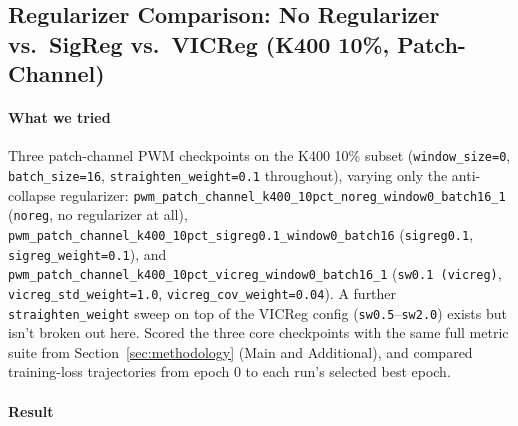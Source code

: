 \subsection{Regularizer Comparison: No Regularizer vs.\ SigReg vs.\ VICReg (K400 10\%, Patch-Channel)}
\label{exp:regularizer-comparison-k400}

\paragraph{What we tried} Three patch-channel PWM checkpoints on the K400 10\% subset
(\texttt{window\_size=0}, \texttt{batch\_size=16}, \texttt{straighten\_weight=0.1}
throughout), varying only the anti-collapse regularizer:
\texttt{pwm\_patch\_channel\_k400\_10pct\_noreg\_window0\_batch16\_1} (\texttt{noreg},
no regularizer at all), \texttt{pwm\_patch\_channel\_k400\_10pct\_sigreg0.1\_window0\_batch16}
(\texttt{sigreg0.1}, \texttt{sigreg\_weight=0.1}), and
\texttt{pwm\_patch\_channel\_k400\_10pct\_vicreg\_window0\_batch16\_1} (\texttt{sw0.1
(vicreg)}, \texttt{vicreg\_std\_weight=1.0}, \texttt{vicreg\_cov\_weight=0.04}). A further
\texttt{straighten\_weight} sweep on top of the VICReg config
(\texttt{sw0.5}--\texttt{sw2.0}) exists but isn't broken out here. Scored the three core
checkpoints with the same full metric suite from Section~\ref{sec:methodology} (Main and
Additional), and compared training-loss trajectories from epoch 0 to each run's selected
best epoch.

\paragraph{Result}

